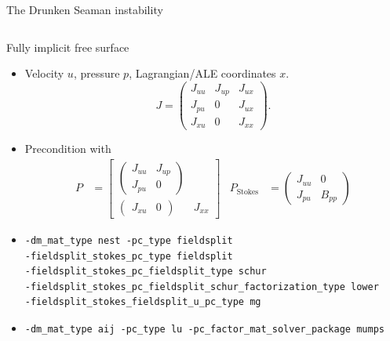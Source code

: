 \documentclass{beamer}
\begin{document}
\begin{frame}[shrink=5]{The Drunken Seaman instability}
\begin{columns}
\begin{column}{0.2\textwidth}
    \end{column}
  \end{columns}
\end{frame}
\begin{frame}[fragile]{Fully implicit free surface}
  \begin{itemize}
  \item Velocity $u$, pressure $p$, Lagrangian/ALE coordinates $x$.
    \begin{equation*}
      J =
      \begin{pmatrix}
        J_{uu} & J_{up} & J_{ux} \\
        J_{pu} & 0 & J_{ux} \\
        J_{xu} & 0 & J_{xx}
      \end{pmatrix} .
    \end{equation*}
  \item Precondition with
    \begin{align*}
      P &=
      \begin{bmatrix}
        \begin{pmatrix}
          J_{uu} & J_{up} \\
          J_{pu} & 0
        \end{pmatrix} & \\
        \begin{pmatrix}
          J_{xu} & 0
        \end{pmatrix}
        & J_{xx}
      \end{bmatrix} &
      P_{\text{Stokes}} &=
      \begin{pmatrix}
        J_{uu} & 0 \\
        J_{pu} & B_{pp}
      \end{pmatrix}
    \end{align*}
  \item {\scriptsize
\begin{verbatim}
-dm_mat_type nest -pc_type fieldsplit
-fieldsplit_stokes_pc_type fieldsplit
-fieldsplit_stokes_pc_fieldsplit_type schur
-fieldsplit_stokes_pc_fieldsplit_schur_factorization_type lower
-fieldsplit_stokes_fieldsplit_u_pc_type mg
\end{verbatim}
}
\item {\scriptsize
\begin{verbatim}
-dm_mat_type aij -pc_type lu -pc_factor_mat_solver_package mumps
\end{verbatim}
}
  \end{itemize}
\end{frame}
\end{document}
